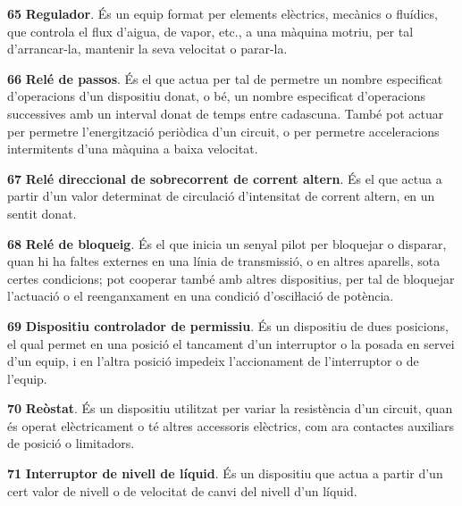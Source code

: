 \begin{multicols}{2}
\begin{list}{}
\item[\textbf{65}]   
\textbf{Regulador}. És un equip format per elements
elèctrics, mecànics o fluídics,  que controla el flux d'aigua, de
vapor, etc.,  a una màquina motriu, per tal d'arrancar-la, mantenir
la seva velocitat o parar-la.

\item[\textbf{66}]   
\textbf{Relé de passos}. És el que actua per tal
de permetre un nombre especificat d'operacions d'un dispositiu
donat, o bé, un nombre especificat d'operacions successives amb un
interval donat de temps entre cadascuna. També pot actuar per
permetre l'energització periòdica d'un circuit, o per permetre acceleracions intermitents d'una
màquina a baixa velocitat.

\item[\textbf{67}]  
\textbf{Relé direccional de sobrecorrent de corrent altern}. És
el que actua a partir d'un valor determinat de circulació
d'intensitat de corrent altern, en un sentit donat.

\item[\textbf{68}]   
\textbf{Relé de bloqueig}. És el que inicia un
senyal pilot per bloquejar o disparar, quan hi ha faltes externes en
una línia de transmissió, o en altres aparells, sota certes
condicions; pot cooperar també amb altres dispositius, per tal de
bloquejar l'actuació o el reenganxament en una condició
 d'osciŀlació de potència.

\item[\textbf{69}]   
\textbf{Dispositiu controlador de permissiu}. És
un dispositiu  de dues posicions, el qual permet en una posició el tancament d'un
interruptor o la posada en servei d'un equip, i en l'altra posició
impedeix l'accionament de l'interruptor o de l'equip.

\item[\textbf{70}]   
\textbf{Reòstat}. És un dispositiu utilitzat per
variar la resistència d'un circuit, quan és operat elèctricament o té altres accessoris elèctrics, com ara contactes auxiliars de posició o limitadors.

\item[\textbf{71}]   
\textbf{Interruptor de nivell de líquid}. És un dispositiu que actua a partir d'un cert valor de nivell o de velocitat de canvi del nivell d'un líquid.


\end{list}
\end{multicols}
